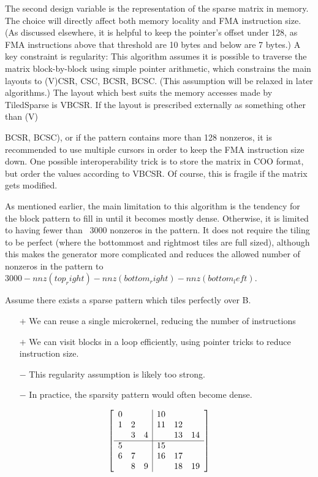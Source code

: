 The second design variable is the representation of the sparse matrix in memory. The choice will
directly affect both memory locality and FMA instruction size. (As discussed elsewhere, it is 
helpful to keep the pointer's offset under 128, as FMA instructions above that threshold are
10 bytes and below are 7 bytes.) A key constraint is regularity: This algorithm assumes it is
possible to traverse the matrix block-by-block using simple pointer arithmetic, which constrains 
the main layouts to (V){CSR, CSC, BCSR, BCSC}. (This assumption will be relaxed in 
later algorithms.) The layout which best suits the memory accesses made by TiledSparse 
is VBCSR. If the layout is prescribed externally as something other than (V){BCSR, BCSC), 
or if the pattern contains more than 128 nonzeros, it is recommended to use multiple cursors in 
order to keep the FMA instruction size down. One possible interoperability trick is to store 
the matrix in COO format, but order the values according to VBCSR. Of course, this is fragile 
if the matrix gets modified.

As mentioned earlier, the main limitation to this algorithm is the tendency for the block pattern to 
fill in until it becomes mostly dense. Otherwise, it is limited to having fewer than ~3000 nonzeros 
in the pattern. It does not require the tiling to be perfect (where the bottommost and rightmost 
tiles are full sized), although this makes the generator more complicated and reduces the allowed 
number of nonzeros in the pattern to $3000 - nnz(top_right) - nnz(bottom_right) - nnz(bottom_left)$. 



        Assume there exists a sparse pattern which tiles perfectly over B.
        \begin{itemize}
        \item[$+$] We can reuse a single microkernel, reducing the number of instructions
        \item[$+$] We can visit blocks in a loop efficiently, using pointer tricks to reduce instruction size.
        \item[$-$] This regularity assumption is likely too strong.
        \item[$-$] In practice, the sparsity pattern would often become dense.
        \end{itemize}


      \[
      \left[
          \begin{array}{c c c | c c c }
          0 &   &   & 10 &   &   \\
          1 & 2 &   & 11& 12&   \\
            & 3 & 4 &   & 13& 14  \\
          \hline
          5 &   &   & 15  &   &   \\
          6 & 7 &   & 16  &17   &   \\
            & 8 & 9 &   & 18  &19   \\
          \end{array}
          \right]
      \]

}
